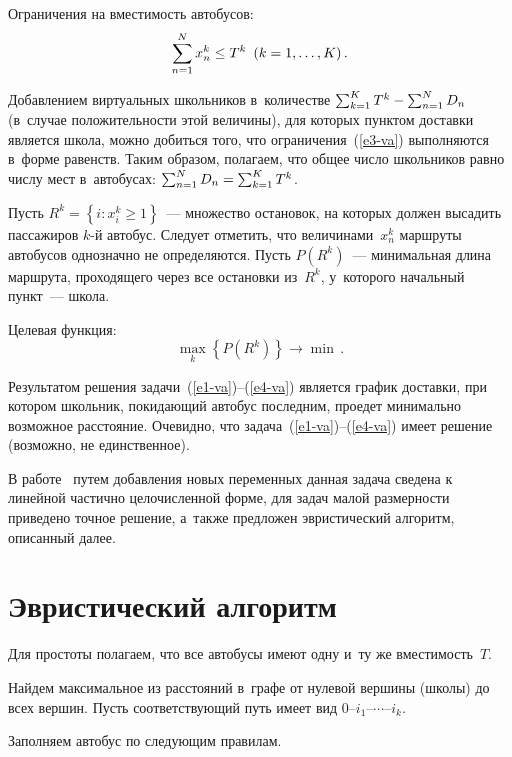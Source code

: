 \begin{multicols}{2}
     Ограничения на вместимость автобусов:
     \begin{equation}
     \sum\limits_{n=1}^N x_n^k \leq T^k\enskip (k=1,\ldots, K)\,.
     \label{e3-va}
     \end{equation}

     Добавлением виртуальных школьников в~количестве
$\sum\nolimits_{k=1}^K T^k\hm- \sum\nolimits_{n=1}^N D_n$ (в~случае
положитель\-ности этой величины), для которых пунктом доставки является
школа, можно добиться того, что ограничения~(\ref{e3-va}) выполняются в~форме равенств. Таким образом, полагаем, что общее число школьников равно
числу мест в~автобусах: $\sum\nolimits_{n=1}^N D_n\hm= \sum\nolimits_{k=1}^K
T^k$.

     Пусть $R^k=\left\{ i\colon x_i^k\geq1\right\}$~--- множество остановок, на
которых должен высадить пассажиров \mbox{$k$-й} автобус. Следует отметить, что
величинами~$x_n^k$ маршруты автобусов однозначно не определяются. Пусть
$P(R^k)$~--- минимальная длина маршрута, проходящего через все остановки
из~$R^k$, у~которого начальный пункт~--- школа.

     Целевая функция:
     \begin{equation}
     \max\limits_k \left\{ P(R^k)\right\}\to \min\,.
     \label{e4-va}
     \end{equation}

     Результатом решения задачи~(\ref{e1-va})--(\ref{e4-va}) является график
доставки, при котором школьник, покидающий автобус последним, проедет
минимально возможное расстояние. Очевидно, что
     задача~(\ref{e1-va})--(\ref{e4-va}) имеет решение (возможно, не
единственное).

В работе~\cite{3-va} путем добавления новых переменных данная задача
сведена к линейной частично целочисленной форме, для задач малой
раз\-мер\-ности приведено точное решение, а~также предложен эвристический
алгоритм, описанный далее.

\section{Эвристический алгоритм}

     Для простоты полагаем, что все автобусы имеют одну и~ту же
вместимость~$T$.

     Найдем максимальное из расстояний в~графе от нулевой вершины
(школы) до всех вершин. Пусть соответствующий путь имеет вид
     0--$i_1$--$\cdots$--$i_k$.

Заполняем автобус по следующим правилам.


\end{multicols}
